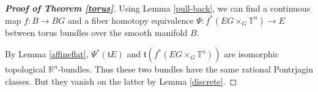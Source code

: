 \documentclass[onecolumn,notitlepage,11pt]{article}
\newcommand{\R}{\mathbb{R}}
\newcommand{\T}{\mathbb{T}}
\theoremstyle{definition}
\begin{document}
\begin{proof}[\textbf{Proof of Theorem \ref{torus}}]
Using Lemma \ref{pull-back}, we can find a continuous map
$f:B\to BG$ and a fiber homotopy equivalence
$\Psi:f^*(EG\times_G\T^n)\to E$ between torus bundles 
over the smooth manifold $B$.

By Lemma \ref{affineflat}, $\Psi^*(\mathfrak{t}E)$ and
$\mathfrak{t}(f^*(EG\times_G\T^n))$ are isomorphic topological 
$\R^n$-bundles. Thus these two bundles have the same rational Pontrjagin 
classes. But they vanish on the latter by Lemma \ref{discrete}.
\end{proof}
\end{document}
